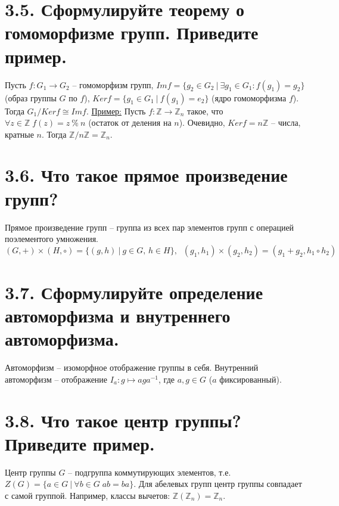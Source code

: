 \documentclass{article}
\begin{document}
\section*{\LARGE 3.5. Сформулируйте теорему о гомоморфизме групп. Приведите пример.}
Пусть $f : G_1 \rightarrow G_2$ -- гомоморфизм групп,
\newline $Imf = \{g_2 \in G_2 \:|\: \exists g_1 \in G_1 : f(g_1) = g_2\}$ (образ группы $G$ по $f$), 
\newline $Kerf = \{g_1 \in G_1 \:|\: f(g_1) = e_2\}$ (ядро гомоморфизма $f$).
\newline Тогда $G_1/Kerf \cong Imf$.
\newline \underline{Пример:}
\newline Пусть $f : \mathbb{Z} \rightarrow \mathbb{Z}_n$ такое, что $\forall z \in \mathbb{Z} \; f(z) = z \:\%\: n$ (остаток от деления на $n$). Очевидно, $Kerf = n\mathbb{Z}$ -- числа, кратные $n$. Тогда $\mathbb{Z}/n\mathbb{Z} = \mathbb{Z}_n$.

\section*{\LARGE 3.6. Что такое прямое произведение групп?}
Прямое произведение групп -- группа из всех пар элементов групп с операцией поэлементого умножения.
$$(G, +) \times (H, \circ) = \{(g, h) \:|\: g \in G,\, h \in H\},\;\; (g_1, h_1)\times(g_2, h_2) = (g_1 + g_2, h_1 \circ h_2)$$

\section*{\LARGE 3.7. Сформулируйте определение автоморфизма и внутреннего автоморфизма. }
Автоморфизм -- изоморфное отображение группы в себя. Внутренний автоморфизм -- отображение $I_a : g \mapsto aga^{-1}$, где $a,g \in G$ ($a$ фиксированный).

\section*{\LARGE 3.8. Что такое центр группы? Приведите пример. }
Центр группы $G$ -- подгруппа коммутирующих элементов, т.е. 
\newline $Z(G) = \{a \in G \:|\: \forall b \in G \; ab = ba\}$.
\newline Для абелевых групп центр группы совпадает с самой группой. Например, 
\newline классы вычетов: $\mathbb{Z}(\mathbb{Z}_n) = \mathbb{Z}_n$.
\end{document}
